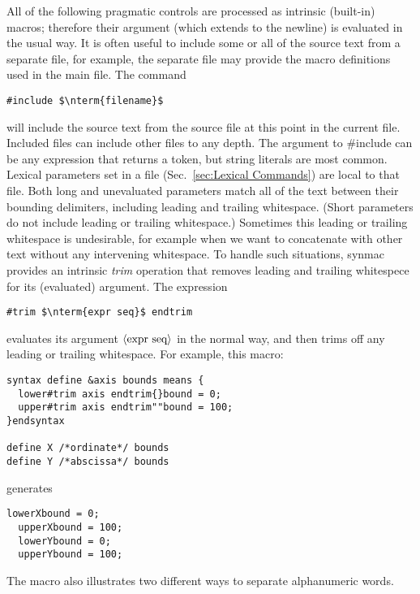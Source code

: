\documentclass[12pt]{article}
\begin{document}
All of the following pragmatic controls are processed as intrinsic (built-in) macros; therefore their argument (which extends to the newline) is evaluated in the usual way.
It is often useful to include some or all of the source text from a separate file, for example, the separate file may provide the macro definitions used in the main file.
The command
\begin{lstlisting}[frame=single,mathescape]
#include $\nterm{filename}$
\end{lstlisting}
will include the source text from the source file at this point in the current file.
Included files can include other files to any depth.
The argument to \#include can be any expression that returns a token, but string literals are most common.
Lexical parameters set in a file (Sec.\ \ref{sec:Lexical Commands}) are local to that file.
Both long and unevaluated parameters match all of the text between their bounding delimiters, including leading and trailing whitespace.
(Short parameters do not include leading or trailing whitespace.)
Sometimes this leading or trailing whitespace is undesirable, for example when we want to concatenate with other text without any intervening whitespace.
To handle such situations, synmac provides an intrinsic \emph{trim} operation that removes leading and trailing whitespece for its (evaluated) argument.
The expression
\begin{lstlisting}[frame=single,mathescape]
#trim $\nterm{expr seq}$ endtrim
\end{lstlisting}
evaluates its argument $\langle\mbox{expr seq}\rangle$ in the normal way, and then trims off any leading or trailing whitespace.
For example, this macro:
\begin{lstlisting}[frame=single,mathescape]
syntax define &axis bounds means {
  lower#trim axis endtrim{}bound = 0;
  upper#trim axis endtrim""bound = 100;
}endsyntax

define X /*ordinate*/ bounds
define Y /*abscissa*/ bounds
\end{lstlisting}
generates
\begin{lstlisting}[frame=single,mathescape]
  lowerXbound = 0;
  upperXbound = 100;
  lowerYbound = 0;
  upperYbound = 100;
\end{lstlisting}
The macro also illustrates two different ways to separate alphanumeric words.
\label{sec:setting-parameters}
\end{document}

